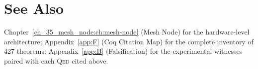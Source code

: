 \section{See Also}

Chapter~\ref{ch_35_mesh_node:ch:mesh-node} (Mesh Node) for the
hardware-level architecture; Appendix~\ref{app:F} (Coq Citation Map) for
the complete inventory of 427 theorems; Appendix~\ref{app:B}
(Falsification) for the experimental witnesses paired with each
\textsc{Qed} cited above.
